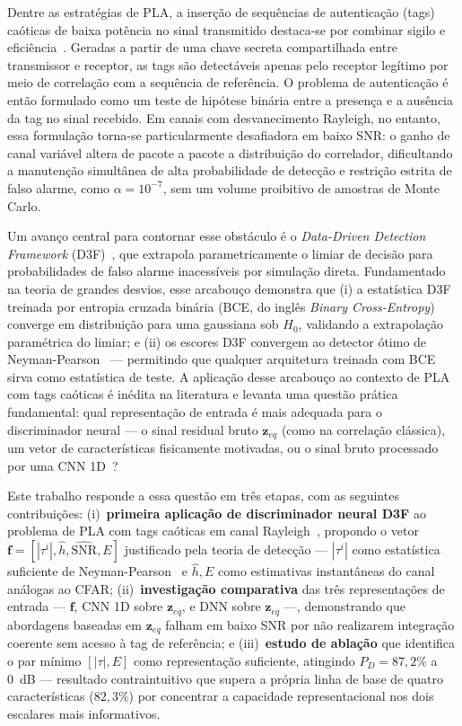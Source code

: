 \documentclass{sbrt}
\begin{document}
Dentre as estratégias de PLA, a inserção de sequências de autenticação (tags) caóticas de baixa potência no sinal transmitido destaca-se por combinar sigilo e eficiência~\cite{ref_joao}. Geradas a partir de uma chave secreta compartilhada entre transmissor e receptor, as tags são detectáveis apenas pelo receptor legítimo por meio de correlação com a sequência de referência. O problema de autenticação é então formulado como um teste de hipótese binária entre a presença e a ausência da tag no sinal recebido. Em canais com desvanecimento Rayleigh, no entanto, essa formulação torna-se particularmente desafiadora em baixo SNR: o ganho de canal variável altera de pacote a pacote a distribuição do correlador, dificultando a manutenção simultânea de alta probabilidade de detecção e restrição estrita de falso alarme, como $\alpha = 10^{-7}$, sem um volume proibitivo de amostras de Monte Carlo.

Um avanço central para contornar esse obstáculo é o \textit{Data-Driven Detection Framework} (D3F)~\cite{ref_braca}, que extrapola parametricamente o limiar de decisão para probabilidades de falso alarme inacessíveis por simulação direta. Fundamentado na teoria de grandes desvios, esse arcabouço demonstra que (i) a estatística D3F treinada por entropia cruzada binária (BCE, do inglês \textit{Binary Cross-Entropy}) converge em distribuição para uma gaussiana sob $H_0$, validando a extrapolação paramétrica do limiar; e (ii) os escores D3F convergem ao detector ótimo de Neyman-Pearson~\cite{ref_poor} — permitindo que qualquer arquitetura treinada com BCE sirva como estatística de teste. A aplicação desse arcabouço ao contexto de PLA com tags caóticas é inédita na literatura e levanta uma questão prática fundamental: qual representação de entrada é mais adequada para o discriminador neural — o sinal residual bruto $\mathbf{z}_{eq}$ (como na correlação clássica), um vetor de características fisicamente motivadas, ou o sinal bruto processado por uma CNN 1D~\cite{ref_liao,ref_oshea}?

Este trabalho responde a essa questão em três etapas, com as seguintes contribuições: (i)~\textbf{primeira aplicação de discriminador neural D3F} ao problema de PLA com tags caóticas em canal Rayleigh~\cite{ref_joao}, propondo o vetor $\mathbf{f} = [|\tau^i|, \hat{h}, \widehat{\text{SNR}}, E]$ justificado pela teoria de detecção — $|\tau^i|$ como estatística suficiente de Neyman-Pearson~\cite{ref_poor} e $\hat{h}, E$ como estimativas instantâneas do canal análogas ao CFAR; (ii)~\textbf{investigação comparativa} das três representações de entrada — $\mathbf{f}$, CNN 1D sobre $\mathbf{z}_{eq}$, e DNN sobre $\mathbf{z}_{eq}$ —, demonstrando que abordagens baseadas em $\mathbf{z}_{eq}$ falham em baixo SNR por não realizarem integração coerente sem acesso à tag de referência; e (iii)~\textbf{estudo de ablação} que identifica o par mínimo $[|\tau|, E]$ como representação suficiente, atingindo $P_D = 87{,}2\%$ a 0~dB — resultado contraintuitivo que supera a própria linha de base de quatro características ($82{,}3\%$) por concentrar a capacidade representacional nos dois escalares mais informativos.
\end{document}
